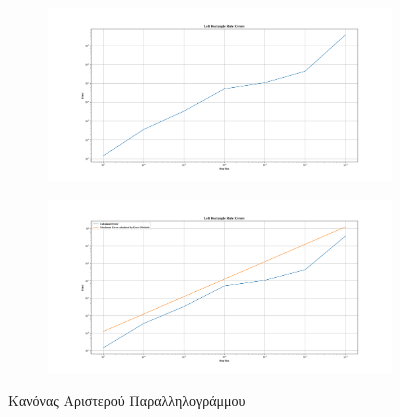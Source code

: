 \documentclass{article}
\begin{document}
\vspace*{\fill}
\noindent
\hspace*{-\oddsidemargin}%
\begin{figure}[H]
    \centering
	
	\begin{adjustbox}{center}
		\begin{subfigure}[c]{.8\textwidth}    
			\includegraphics[width=1\textwidth,height=\textheight,keepaspectratio]{media/1/Figure_1.png}
		\end{subfigure}%

    	\begin{subfigure}[c]{.8\textwidth}
			\includegraphics[width=1\textwidth,height=\textheight,keepaspectratio]{media/1/Figure_2.png}
		\end{subfigure}
	\end{adjustbox}
	\caption{Κανόνας Αριστερού Παραλληλογράμμου}
	
    \label{(Left_Rectangular_Rule)}
\end{figure}
\vspace*{\fill}
\end{document}
